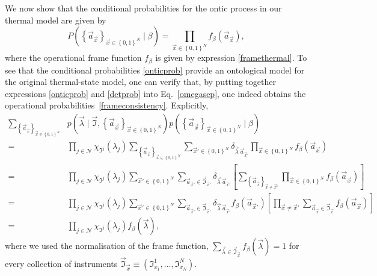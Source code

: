 \documentclass[a4paper,onecolumn,11pt,accepted=2018-05-04]{quantumarticle}
\begin{document}
We now show that the conditional probabilities for the ontic process in our thermal model are given by
\begin{equation}
P\left(\left\{\vec{a}_{\vec{x}}\right\}_{\vec{x}\in \left\{0,1\right\}^N} \mid\beta\right) = \prod_{\vec{x}\in\left\{0,1\right\}^N}f_{\beta}(\vec{a}_{\vec{x}}),
\label{onticprob}
\end{equation}
where the operational frame function $f_{\beta}$ is given by expression \eqref{framethermal}. To see that the conditional probabilities \eqref{onticprob} provide an ontological model for the original thermal-state model, one can verify that, by putting together expressions \eqref{onticprob} and \eqref{detprob} into Eq.~\eqref{omegasep}, one indeed obtains the operational probabilities~\eqref{frameconsistency}.
 Explicitly, 
\begin{align*}
\sum_{\left\{\vec{a}_{\vec{x}}\right\}_{\vec{x}\in \left\{0,1\right\}^N}}&
p\left(\vec{\lambda}\mid \vec{\mathfrak{I}}, \left\{\vec{a}_{\vec{x}}\right\}_{\vec{x}\in \left\{0,1\right\}^N}\right) p(\left\{\vec{a}_{\vec{x}}\right\}_{\vec{x}\in \left\{0,1\right\}^N} \mid \beta) \\
%
=&
\prod_{j\in \mathcal{N}}\chi_{\mathfrak{I}^j}(\lambda_j) 
\sum_{\left\{\vec{a}_{\vec{x}}\right\}_{\vec{x}\in \left\{0,1\right\}^N}}
\sum_{\vec{x}'\in \left\{0,1\right\}^N} \delta_{\vec{\lambda}\,\vec{a}_{\vec{x}'}} \prod_{\vec{x}\in\left\{0,1\right\}^N}f_{\beta}(\vec{a}_{\vec{x}}) \\
%
=& \prod_{j\in \mathcal{N}}\chi_{\mathfrak{I}^j}(\lambda_j) 
\sum_{\vec{x}'\in \left\{0,1\right\}^N} 
\sum_{\vec{a}_{\vec{x}'}\in\vec{\mathfrak{I}}_{\vec{x}'}}
\delta_{\vec{\lambda}\,\vec{a}_{\vec{x}'}} 
\left[\sum_{\left\{\vec{a}_{\vec{x}}\right\}_{\vec{x}\neq \vec{x}'}}\prod_{\vec{x}\in\left\{0,1\right\}^N}f_{\beta}(\vec{a}_{\vec{x}})
\right]\\
%
=& \prod_{j\in \mathcal{N}}\chi_{\mathfrak{I}^j}(\lambda_j) 
\sum_{\vec{x}'\in \left\{0,1\right\}^N} 
\sum_{\vec{a}_{\vec{x}'}\in\vec{\mathfrak{I}}_{\vec{x}'}}
\delta_{\vec{\lambda}\,\vec{a}_{\vec{x}'}} f_{\beta}(\vec{a}_{\vec{x}'})
\left[\prod_{\vec{x} \neq \vec{x}'} \sum_{\vec{a}_{\vec{x}}\in\vec{\mathfrak{I}}_{\vec{x}}}
f_{\beta}(\vec{a}_{\vec{x}})
\right] \\
%
=& \prod_{j\in \mathcal{N}}\chi_{\mathfrak{I}^j}(\lambda_j) 
 f_{\beta}(\vec{\lambda}), 
\end{align*}
where we used the normalisation of the frame function, $\sum_{\vec{\lambda}\in\vec{\mathfrak{I}}_{\vec{x}}}
f_{\beta}(\vec{\lambda})=1$ for every collection of instruments $\vec{\mathfrak{I}}_{\vec{x}}\equiv \left(\mathfrak{I}^1_{x_1},\dots,\mathfrak{I}^N_{x_N}\right)$.
\end{document}

